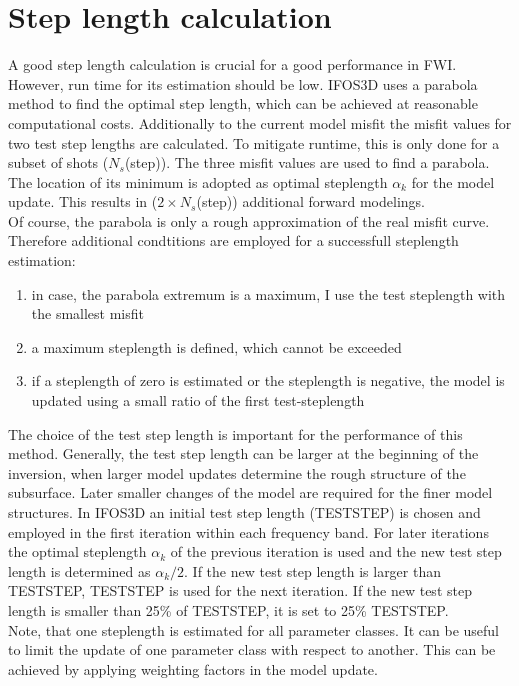 \section{Step length calculation}\label{sec:steplength}
A good step length calculation is crucial for a good performance in FWI. However, run time for its estimation should be low. IFOS3D uses a parabola  method \citep[e.g.][]{Kur09} to find the optimal step length, which can be achieved at reasonable computational costs. Additionally to the current model misfit the misfit values for two test step lengths are calculated. To mitigate runtime, this is only done for a subset of shots ($N_s$(step)). The three misfit values are used to find a parabola. The location of its minimum is adopted as optimal steplength $\alpha_k$ for the  model update. This results in ($2\times N_s$(step)) additional forward modelings.\\
Of course, the parabola is only a rough approximation of the real misfit curve. Therefore additional condtitions are employed for a successfull steplength estimation:
\begin{enumerate}
 \item in case, the parabola extremum is a maximum, I use the test steplength with the smallest misfit
\item a maximum steplength is defined, which cannot be exceeded
\item if a steplength of zero is estimated or the steplength is negative, the model is updated using a small ratio of the first test-steplength
\end{enumerate}
The choice of the test step length is important for the performance of this method. Generally, the test step length can be larger at the beginning of the inversion, when larger model updates determine the rough structure of the subsurface. Later smaller changes of the model are required for the finer model structures. In IFOS3D an initial test step length (TESTSTEP) is chosen and employed in the first iteration within each frequency band. For later iterations the optimal steplength $\alpha_k$ of the previous iteration is used and the new test step length is determined as $\alpha_k/2$. If the new test step length is larger than TESTSTEP, TESTSTEP is used for the next iteration. If the new test step length is smaller than 25\% of TESTSTEP, it is set to 25\% TESTSTEP.\\
Note, that one steplength is estimated for all parameter classes. It can be useful to limit the update of one parameter class with respect to another. This can be achieved by applying weighting factors in the model update. 
